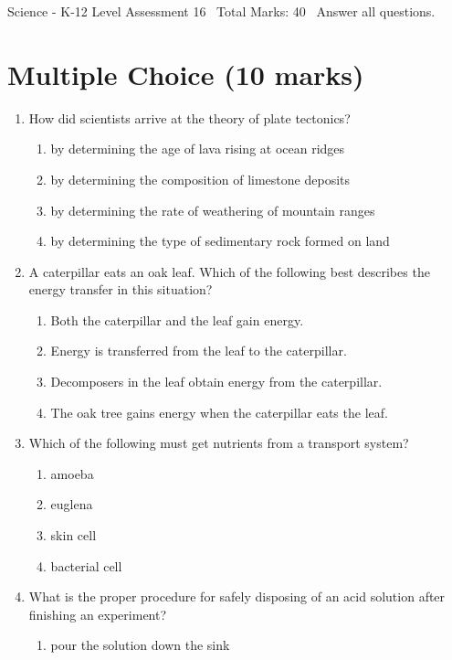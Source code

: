 \documentclass[12pt]{article}
\begin{document}
\begin{center}
Science - K-12 Level Assessment 16 \
Total Marks: 40 \
Answer all questions.
\end{center}

\section*{Multiple Choice (10 marks)}
\begin{enumerate}[label=\arabic*.]
\item How did scientists arrive at the theory of plate tectonics?
\begin{enumerate}[label=(\alph*)]
    \item by determining the age of lava rising at ocean ridges
    \item by determining the composition of limestone deposits
    \item by determining the rate of weathering of mountain ranges
    \item by determining the type of sedimentary rock formed on land
\end{enumerate}
\item A caterpillar eats an oak leaf. Which of the following best describes the energy transfer in this situation?
\begin{enumerate}[label=(\alph*)]
    \item Both the caterpillar and the leaf gain energy.
    \item Energy is transferred from the leaf to the caterpillar.
    \item Decomposers in the leaf obtain energy from the caterpillar.
    \item The oak tree gains energy when the caterpillar eats the leaf.
\end{enumerate}
\item Which of the following must get nutrients from a transport system?
\begin{enumerate}[label=(\alph*)]
    \item amoeba
    \item euglena
    \item skin cell
    \item bacterial cell
\end{enumerate}
\item What is the proper procedure for safely disposing of an acid solution after finishing an experiment?
\begin{enumerate}[label=(\alph*)]
    \item pour the solution down the sink

\end{enumerate}
\end{enumerate}
\end{document}
